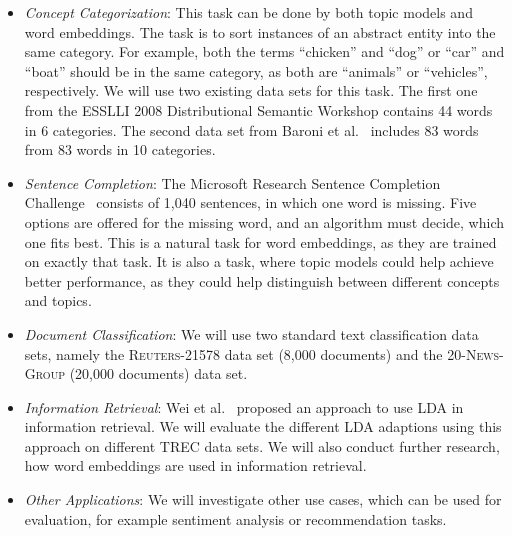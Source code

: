 \documentclass{sig-alternate-05-2015}
\begin{document}
\begin{itemize}
       \item
              \emph{Concept Categorization}:
              This task can be done by both topic models and word embeddings.
              The task is to sort instances of an abstract entity into the same category.
              For example, both the terms ``chicken'' and ``dog'' or ``car'' and ``boat'' should be in the same category, as both are ``animals'' or ``vehicles'', respectively.
              We will use two existing data sets for this task.
              The first one from the ESSLLI 2008 Distributional Semantic Workshop contains 44 words in 6 categories.
              The second data set from Baroni et al.~\cite{Baroni2010} includes 83 words from 83 words in 10 categories.
       \item
              \emph{Sentence Completion}:
              The Microsoft Research Sentence Completion Challenge~\cite{Zweig2011} consists of 1,040 sentences, in which one word is missing.
              Five options are offered for the missing word, and an algorithm must decide, which one fits best.
              This is a natural task for word embeddings, as they are trained on exactly that task.
              It is also a task, where topic models could help achieve better performance, as they could help distinguish between different concepts and topics.
       \item
              \emph{Document Classification}:
              We will use two standard text classification data sets, namely the \textsc{Reuters-21578} data set (8,000 documents) and the \textsc{20-News-Group} (20,000 documents) data set.
       \item
              \emph{Information Retrieval}:
              Wei et al.~\cite{Wei2006} proposed an approach to use LDA in information retrieval.
              We will evaluate the different LDA adaptions using this approach on different TREC data sets.
              We will also conduct further research, how word embeddings are used in information retrieval.
       \item
              \emph{Other Applications}: We will investigate other use cases, which can be used for evaluation, for example sentiment analysis or recommendation tasks.

\end{itemize}
\end{document}

